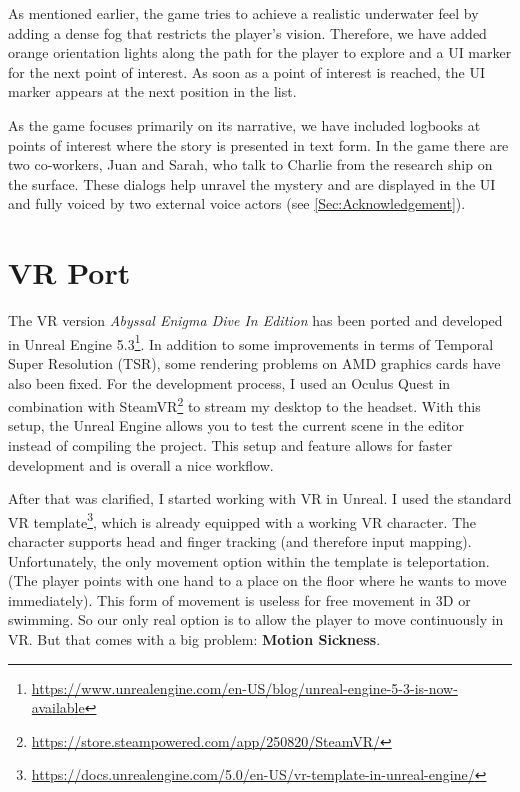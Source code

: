 \documentclass[letterpaper, 10 pt, conference]{ieeeconf}  %
\begin{document}
As mentioned earlier, the game tries to achieve a realistic underwater feel by adding a dense fog that restricts the player's vision.
Therefore, we have added orange orientation lights along the path for the player to explore and a UI marker for the next point of interest.
As soon as a point of interest is reached, the UI marker appears at the next position in the list.

As the game focuses primarily on its narrative, we have included logbooks at points of interest where the story is presented in text form.
In the game there are two co-workers, Juan and Sarah, who talk to Charlie from the research ship on the surface.
These dialogs help unravel the mystery and are displayed in the UI and fully voiced by two external voice actors (see \ref{Sec:Acknowledgement}).

\section{VR Port}
\label{Sec:VR}
The VR version \textit{Abyssal Enigma Dive In Edition} has been ported and developed in Unreal Engine 5.3\footnote{\url{https://www.unrealengine.com/en-US/blog/unreal-engine-5-3-is-now-available}}.
In addition to some improvements in terms of Temporal Super Resolution (TSR), some rendering problems on AMD graphics cards have also been fixed.
For the development process, I used an Oculus Quest in combination with SteamVR\footnote{\url{https://store.steampowered.com/app/250820/SteamVR/}} to stream my desktop to the headset.
With this setup, the Unreal Engine allows you to test the current scene in the editor instead of compiling the project.
This setup and feature allows for faster development and is overall a nice workflow.

After that was clarified, I started working with VR in Unreal.
I used the standard VR template\footnote{\url{https://docs.unrealengine.com/5.0/en-US/vr-template-in-unreal-engine/}}, which is already equipped with a working VR character.
The character supports head and finger tracking (and therefore input mapping).
Unfortunately, the only movement option within the template is teleportation.
(The player points with one hand to a place on the floor where he wants to move immediately).
This form of movement is useless for free movement in 3D or swimming.
So our only real option is to allow the player to move continuously in VR.
But that comes with a big problem: \textbf{Motion Sickness}.
\end{document}
